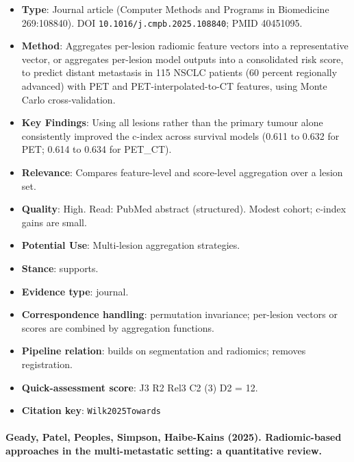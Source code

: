 \documentclass[journal,onecolumn]{IEEEtran}
\begin{document}
\begin{itemize}

\item{} \textbf{Type}: Journal article (Computer Methods and Programs in Biomedicine 269:108840). DOI \nolinkurl{10.1016/j.cmpb.2025.108840}; PMID 40451095.

\item{} \textbf{Method}: Aggregates per-lesion radiomic feature vectors into a representative vector, or aggregates per-lesion model outputs into a consolidated risk score, to predict distant metastasis in 115 NSCLC patients (60 percent regionally advanced) with PET and PET-interpolated-to-CT features, using Monte Carlo cross-validation.

\item{} \textbf{Key Findings}: Using all lesions rather than the primary tumour alone consistently improved the c-index across survival models (0.611 to 0.632 for PET; 0.614 to 0.634 for PET\_CT).

\item{} \textbf{Relevance}: Compares feature-level and score-level aggregation over a lesion set.

\item{} \textbf{Quality}: High. Read: PubMed abstract (structured). Modest cohort; c-index gains are small.

\item{} \textbf{Potential Use}: Multi-lesion aggregation strategies.

\item{} \textbf{Stance}: supports.

\item{} \textbf{Evidence type}: journal.

\item{} \textbf{Correspondence handling}: permutation invariance; per-lesion vectors or scores are combined by aggregation functions.

\item{} \textbf{Pipeline relation}: builds on segmentation and radiomics; removes registration.

\item{} \textbf{Quick-assessment score}: J3 R2 Rel3 C2 (3) D2 = 12.

\item{} \textbf{Citation key}: \texttt{Wilk2025Towards}

\end{itemize}

\paragraph{Geady, Patel, Peoples, Simpson, Haibe-Kains (2025). Radiomic-based approaches in the multi-metastatic setting: a quantitative review.~\cite{Geady2025Radiomic}}\mbox{}
\end{document}
